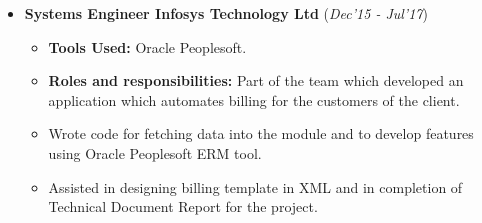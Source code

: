 \documentclass[10pt]{article}
\begin{document}
\begin{itemize}[leftmargin=0.4cm]
	\item \textbf{Systems Engineer \textpipe  \hspace{0.05cm} Infosys Technology Ltd} \hfill{(\textit{Dec'15 - Jul'17})}
	
	\begin{itemize}
	    \item  \textbf{Tools Used:} Oracle Peoplesoft.
		\item \textbf{Roles and responsibilities:} Part of the team which developed an application which automates billing for the customers of the client.
		\item Wrote code for fetching data into the module and to develop features using Oracle Peoplesoft ERM tool.
		\item Assisted in designing billing template in XML and in completion of Technical Document Report for the project.
	
	\end{itemize}
\end{itemize}


\colorbox{bl}{}
\end{document}
